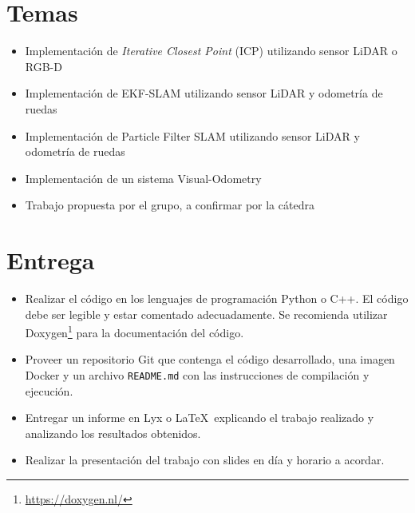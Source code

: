 \documentclass[tp]{lcc}
\begin{document}
	\maketitle
	
	
	\section{Temas}
	\begin{itemize}
		
		\item Implementación de \emph{Iterative Closest Point} (ICP) utilizando sensor LiDAR o RGB-D
		\item Implementación de EKF-SLAM utilizando sensor LiDAR y odometría de ruedas
		\item Implementación de Particle Filter SLAM utilizando sensor LiDAR y odometría de ruedas
		\item Implementación de un sistema Visual-Odometry
		\item Trabajo propuesta por el grupo, a confirmar por la cátedra
	
	\end{itemize}
		
	\section{Entrega}
	\begin{itemize}
		
		\item Realizar el código en los lenguajes de programación Python o C++. El código debe ser legible y estar comentado adecuadamente. Se recomienda utilizar Doxygen\footnote{\url{https://doxygen.nl/}} para la documentación del código.
		
		\item Proveer un repositorio Git que contenga el código desarrollado, una imagen Docker y un archivo \lstinline{README.md} con las instrucciones de compilación y ejecución.
		
		\item Entregar un informe en Lyx o \LaTeX\  explicando el trabajo realizado y analizando los resultados obtenidos.
		
		\item Realizar la presentación del trabajo con slides en día y horario a acordar.		
	\end{itemize}
\end{document}

